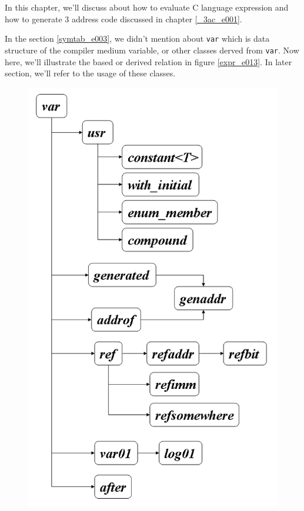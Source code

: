 \label{expr_e000}
In this chapter, we'll discuss about how to evaluate
C language expression and how to generate 3 address code
discussed in chapter \ref{_3ac_e001}.

In the section \ref{symtab_e003}, we didn't mention about {\tt{var}} 
which is data structure of the compiler medium variable, or other
classes derved from {\tt{var}}. Now here, we'll illustrate
the based or derived relation in figure \ref{expr_e013}.
In later section, we'll refer to the usage of these classes.

\begin{figure}[htbp]
\begin{center}
\begin{htmlonly}
\includegraphics[width=1.0\linewidth,height=1.626\linewidth]{var.png}

\end{htmlonly}
\end{center}
\end{figure}
